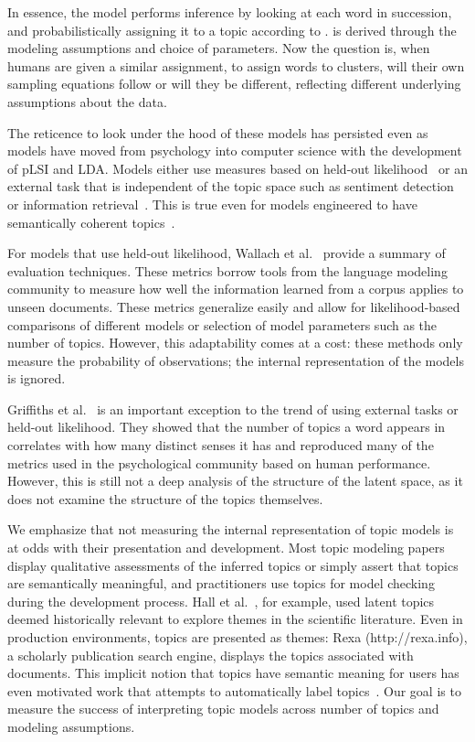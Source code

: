 In essence, the model performs inference by looking at each word in
succession, and probabilistically assigning it to a topic according to
.   is derived through the
modeling assumptions and choice of parameters.  Now the question is,
when humans are given a similar assignment, to assign words to
clusters, will their own sampling equations follow 
or will they be different, reflecting different underlying assumptions
about the data.


The reticence to look under the hood of these models has persisted
even as models have moved from psychology into computer science with
the development of pLSI and LDA.  Models either use measures based on
held-out likelihood~\cite{blei-03,blei-06} or an external task that is
independent of the topic space such as sentiment
detection~\cite{titov-08} or information retrieval~\cite{wei-06}.
This is true even for models engineered to have semantically coherent
topics~\cite{boyd-graber-07}.

For models that use held-out likelihood, Wallach et
al.~\cite{wallach-09} provide a summary of evaluation
techniques. These metrics borrow tools from the language modeling
community to measure how well the information learned from a corpus
applies to unseen documents.  These metrics generalize easily and
allow for likelihood-based comparisons of different models or
selection of model parameters such as the number of topics.  However,
this adaptability comes at a cost: these methods only measure the
probability of observations; the internal representation of the models
is ignored.

Griffiths et al.~\cite{griffiths-06} is an important exception to the
trend of using external tasks or held-out likelihood.  They showed
that the number of topics a word appears in correlates with how many
distinct senses it has and reproduced many of the metrics used in the
psychological community based on human performance.  However, this is
still not a deep analysis of the structure of the latent space, as it
does not examine the structure of the topics themselves.

We emphasize that not measuring the internal representation of topic
models is at odds with their presentation and development.  Most topic
modeling papers display qualitative assessments of the inferred topics
or simply assert that topics are semantically meaningful, and
practitioners use topics for model checking during the development
process.  Hall et al.~\cite{hall-08}, for example, used latent topics
deemed historically relevant to explore themes in the scientific
literature.  Even in production environments, topics are presented as
themes: Rexa (http://rexa.info), a scholarly publication search
engine, displays the topics associated with documents.  This implicit
notion that topics have semantic meaning for users has even
motivated work that attempts to automatically label
topics~\cite{mei-07}.  Our goal is to measure the success of
interpreting topic models across number of topics and modeling
assumptions.
